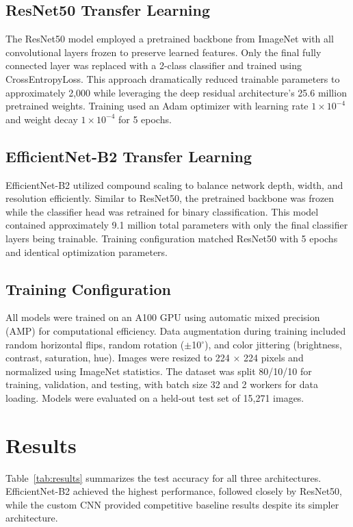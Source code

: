 \documentclass[man,12pt,letterpaper,donotrepeattitle,floatsintext]{apa7}
\begin{document}
\subsection{ResNet50 Transfer Learning}
The ResNet50 model employed a pretrained backbone from ImageNet with all convolutional 
layers frozen to preserve learned features. Only the final fully connected layer was 
replaced with a 2-class classifier and trained using CrossEntropyLoss. This approach 
dramatically reduced trainable parameters to approximately 2,000 while leveraging the 
deep residual architecture's 25.6 million pretrained weights. Training used an Adam 
optimizer with learning rate $1 \times 10^{-4}$ and weight decay $1 \times 10^{-4}$ 
for 5 epochs.

\subsection{EfficientNet-B2 Transfer Learning}
EfficientNet-B2 utilized compound scaling to balance network depth, width, and resolution 
efficiently. Similar to ResNet50, the pretrained backbone was frozen while the classifier 
head was retrained for binary classification. This model contained approximately 9.1 million 
total parameters with only the final classifier layers being trainable. Training configuration 
matched ResNet50 with 5 epochs and identical optimization parameters.

\subsection{Training Configuration}
All models were trained on an A100 GPU using automatic mixed precision (AMP) for computational 
efficiency. Data augmentation during training included random horizontal flips, random rotation 
($\pm$10$^\circ$), and color jittering (brightness, contrast, saturation, hue). Images were resized to 
224 $\times$ 224 pixels and normalized using ImageNet statistics. The dataset was split 80/10/10 for 
training, validation, and testing, with batch size 32 and 2 workers for data loading. 
Models were evaluated on a held-out test set of 15,271 images.

\section{Results}
\label{results}

Table~\ref{tab:results} summarizes the test accuracy for all three architectures. 
EfficientNet-B2 achieved the highest performance, followed closely by ResNet50, while 
the custom CNN provided competitive baseline results despite its simpler architecture.
\end{document}
